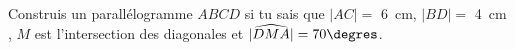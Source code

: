 %
%
    Construis un parallélogramme $ABCD$ si tu sais que $|AC|=$ \SI{6}{cm}, $|BD|=$ \SI{4}{cm} , $M$ est l'intersection des diagonales et $|\widehat{DMA}| = 70\degres $.
